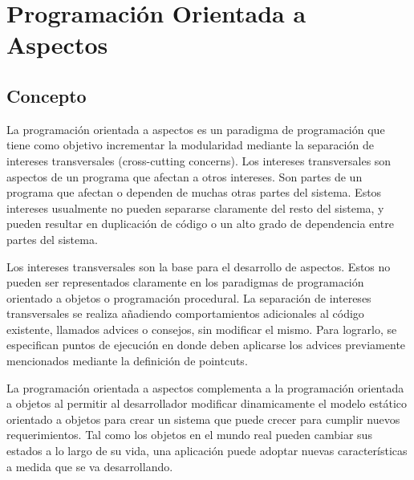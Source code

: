 \section{Programación Orientada a Aspectos}
\label{sec:aop}

\subsection{Concepto}

La programación orientada a aspectos es un paradigma de programación que tiene
como objetivo incrementar la modularidad mediante la separación de intereses
transversales (cross-cutting concerns). 
Los intereses transversales son aspectos de un programa que afectan a otros
intereses. Son partes de un programa que afectan o dependen de muchas
otras partes del sistema.
Estos intereses usualmente no pueden separarse claramente del resto del
sistema, y pueden resultar en duplicación de código o un alto grado de
dependencia entre partes del sistema.


Los intereses transversales son la base para el desarrollo de aspectos. Estos no
pueden ser representados claramente en los paradigmas de programación orientado
a objetos o programación procedural. \cite{AspectJInAction}
La separación de intereses transversales se realiza añadiendo comportamientos
adicionales al código existente, llamados advices o consejos, sin modificar el
mismo. Para lograrlo, se especifican puntos de ejecución en donde deben
aplicarse los advices previamente mencionados mediante la definición de
pointcuts.

La programación orientada a aspectos complementa a la programación orientada a
objetos al permitir al desarrollador modificar dinamicamente el modelo estático
orientado a objetos para crear un sistema que puede crecer para cumplir nuevos
requerimientos. Tal como los objetos en el mundo real pueden cambiar sus estados
a lo largo de su vida, una aplicación puede adoptar nuevas características a
medida que se va desarrollando. \cite{Introduction_To_Aspect}


